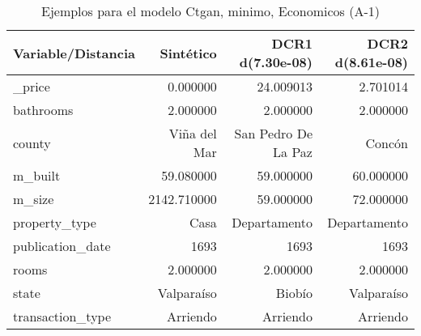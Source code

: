 \begin{table}[H]
\centering
\fontsize{10}{14}\selectfont
\caption{Ejemplos para el modelo Ctgan, minimo, Economicos (A-1)}
\label{table-example-economicos-a-1-ctgan-min}
\begin{tabular}{|l|r|r|r|}
\hline
\rowcolor[gray]{0.8}
Variable/Distancia & Sintético & DCR1 d(7.30e-08) & DCR2 d(8.61e-08) \\
\hline \_price & \cellcolor[rgb]{0.9, 0.54, 0.52} 0.000000 & 24.009013 & 2.701014 \\
\hline bathrooms & \cellcolor[rgb]{0.9, 0.54, 0.52} 2.000000 & \cellcolor[rgb]{0.9, 0.54, 0.52} 2.000000 & \cellcolor[rgb]{0.9, 0.54, 0.52} 2.000000 \\
\hline county & \cellcolor[rgb]{0.9, 0.54, 0.52} Viña del Mar & San Pedro De La Paz & Concón \\
\hline m\_built & \cellcolor[rgb]{0.9, 0.54, 0.52} 59.080000 & 59.000000 & 60.000000 \\
\hline m\_size & \cellcolor[rgb]{0.9, 0.54, 0.52} 2142.710000 & 59.000000 & 72.000000 \\
\hline property\_type & \cellcolor[rgb]{0.9, 0.54, 0.52} Casa & Departamento & Departamento \\
\hline publication\_date & \cellcolor[rgb]{0.9, 0.54, 0.52} 1693 & \cellcolor[rgb]{0.9, 0.54, 0.52} 1693 & \cellcolor[rgb]{0.9, 0.54, 0.52} 1693 \\
\hline rooms & \cellcolor[rgb]{0.9, 0.54, 0.52} 2.000000 & \cellcolor[rgb]{0.9, 0.54, 0.52} 2.000000 & \cellcolor[rgb]{0.9, 0.54, 0.52} 2.000000 \\
\hline state & \cellcolor[rgb]{0.9, 0.54, 0.52} Valparaíso & Biobío & \cellcolor[rgb]{0.9, 0.54, 0.52} Valparaíso \\
\hline transaction\_type & \cellcolor[rgb]{0.9, 0.54, 0.52} Arriendo & \cellcolor[rgb]{0.9, 0.54, 0.52} Arriendo & \cellcolor[rgb]{0.9, 0.54, 0.52} Arriendo \\
\hline
\end{tabular}
\end{table}
